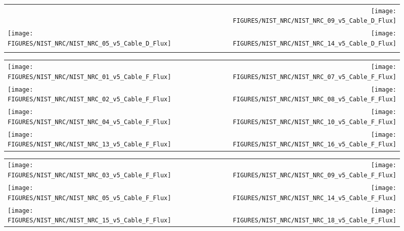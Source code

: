\begin{figure}[h!]
\begin{tabular*}{\textwidth}{l@{\extracolsep{\fill}}r}
                           &
\texttt{[image: FIGURES/NIST\_NRC/NIST\_NRC\_09\_v5\_Cable\_D\_Flux]} \\
\texttt{[image: FIGURES/NIST\_NRC/NIST\_NRC\_05\_v5\_Cable\_D\_Flux]} &
\texttt{[image: FIGURES/NIST\_NRC/NIST\_NRC\_14\_v5\_Cable\_D\_Flux]} \\
                      &

\end{tabular*}
\label{NIST_NRC_Cable_D_Flux_Open}
\end{figure}


\begin{figure}[h!]
\begin{tabular*}{\textwidth}{l@{\extracolsep{\fill}}r}
\texttt{[image: FIGURES/NIST\_NRC/NIST\_NRC\_01\_v5\_Cable\_F\_Flux]} &
\texttt{[image: FIGURES/NIST\_NRC/NIST\_NRC\_07\_v5\_Cable\_F\_Flux]} \\
\texttt{[image: FIGURES/NIST\_NRC/NIST\_NRC\_02\_v5\_Cable\_F\_Flux]} &
\texttt{[image: FIGURES/NIST\_NRC/NIST\_NRC\_08\_v5\_Cable\_F\_Flux]} \\
\texttt{[image: FIGURES/NIST\_NRC/NIST\_NRC\_04\_v5\_Cable\_F\_Flux]} &
\texttt{[image: FIGURES/NIST\_NRC/NIST\_NRC\_10\_v5\_Cable\_F\_Flux]} \\
\texttt{[image: FIGURES/NIST\_NRC/NIST\_NRC\_13\_v5\_Cable\_F\_Flux]} &
\texttt{[image: FIGURES/NIST\_NRC/NIST\_NRC\_16\_v5\_Cable\_F\_Flux]}
\end{tabular*}
\label{NIST_NRC_Cable_F_Flux_Closed}
\end{figure}

\begin{figure}[h!]
\begin{tabular*}{\textwidth}{l@{\extracolsep{\fill}}r}
\texttt{[image: FIGURES/NIST\_NRC/NIST\_NRC\_03\_v5\_Cable\_F\_Flux]} &
\texttt{[image: FIGURES/NIST\_NRC/NIST\_NRC\_09\_v5\_Cable\_F\_Flux]} \\
\texttt{[image: FIGURES/NIST\_NRC/NIST\_NRC\_05\_v5\_Cable\_F\_Flux]} &
\texttt{[image: FIGURES/NIST\_NRC/NIST\_NRC\_14\_v5\_Cable\_F\_Flux]} \\
\texttt{[image: FIGURES/NIST\_NRC/NIST\_NRC\_15\_v5\_Cable\_F\_Flux]} &
\texttt{[image: FIGURES/NIST\_NRC/NIST\_NRC\_18\_v5\_Cable\_F\_Flux]}
\end{tabular*}
\label{NIST_NRC_Cable_F_Flux_Open}
\end{figure}

